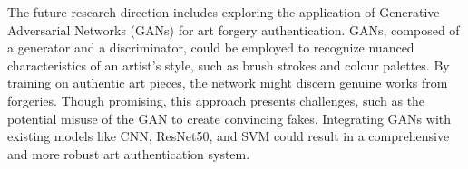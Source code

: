 \documentclass[a0,portrait]{a0poster}
\begin{document}
\begin{multicols}{2}
The future research direction includes exploring the application of Generative Adversarial Networks (GANs) for art forgery authentication. GANs, composed of a generator and a discriminator, could be employed to recognize nuanced characteristics of an artist's style, such as brush strokes and colour palettes. By training on authentic art pieces, the network might discern genuine works from forgeries. Though promising, this approach presents challenges, such as the potential misuse of the GAN to create convincing fakes. Integrating GANs with existing models like CNN, ResNet50, and SVM could result in a comprehensive and more robust art authentication system.


\nocite{*} %

\end{multicols}
\end{document}
